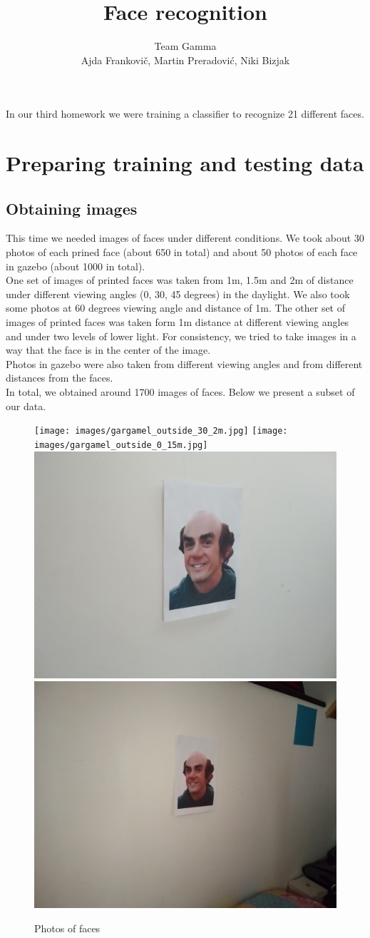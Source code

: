 \documentclass[12pt,a4paper]{article}
\author{Team Gamma \\ {\small Ajda Frankovič, Martin Preradović, Niki Bizjak}}
\title{Face recognition}
\date{}
\begin{document}
    \maketitle

    In our third homework we were training a classifier to recognize 21 different faces.

    \section{Preparing training and testing data}

    \subsection{Obtaining images}

    This time we needed images of faces under different conditions. We took about 30 photos of each prined face (about 650 in total) and about 50 photos of each face in gazebo (about 1000 in total). \\

    One set of images of printed faces was taken from 1m, 1.5m and 2m of distance under different viewing angles (0, 30, 45 degrees) in the daylight. We also took some photos at 60 degrees viewing angle and distance of 1m. 
    The other set of images of printed faces was taken form 1m distance at different viewing angles and under two levels of lower light.
    For consistency, we tried to take images in a way that the face is in the center of the image. \\

    Photos in gazebo were also taken from different viewing angles and from different distances from the faces. \\

    In total, we obtained around 1700 images of faces. Below we present a subset of our data.

    \begin{figure}[H]
        \centering
        \texttt{[image: images/gargamel\_outside\_30\_2m.jpg]}
        \texttt{[image: images/gargamel\_outside\_0\_15m.jpg]}
        \includegraphics[width=.20\linewidth]{images/gargamel_inside_30_light.jpg}
        \includegraphics[width=.20\linewidth]{images/gargamel_inside_30_dark.jpg}
        \caption{Photos of faces}
    \end{figure}
\end{document}
